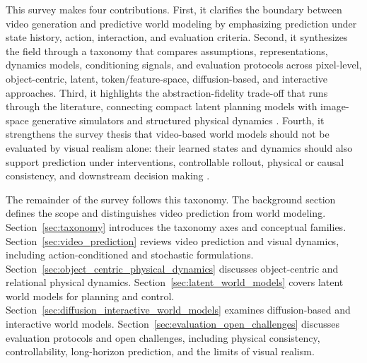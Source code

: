This survey makes four contributions. First, it clarifies the boundary between video generation and predictive world modeling by emphasizing prediction under state history, action, interaction, and evaluation criteria. Second, it synthesizes the field through a taxonomy that compares assumptions, representations, dynamics models, conditioning signals, and evaluation protocols across pixel-level, object-centric, latent, token/feature-space, diffusion-based, and interactive approaches. Third, it highlights the abstraction-fidelity trade-off that runs through the literature, connecting compact latent planning models with image-space generative simulators and structured physical dynamics \cite{battaglia2016_interaction_networks_prov,watters2017_visual_interaction_networks_prov,janner2019_o2p2_prov,hafner2019_planet_prov,hafner2020_dreamer_prov,alonso2024_diamond_prov}. Fourth, it strengthens the survey thesis that video-based world models should not be evaluated by visual realism alone: their learned states and dynamics should also support prediction under interventions, controllable rollout, physical or causal consistency, and downstream decision making \cite{oh2015_action_conditional_video_prediction_prov,janner2019_o2p2_prov,alonso2024_diamond_prov,bruce2024_genie_prov,bansal2025_videophy_prov,li2025worldmodelbench_prov}.

The remainder of the survey follows this taxonomy. The background section defines the scope and distinguishes video prediction from world modeling. Section~\ref{sec:taxonomy} introduces the taxonomy axes and conceptual families. Section~\ref{sec:video_prediction} reviews video prediction and visual dynamics, including action-conditioned and stochastic formulations. Section~\ref{sec:object_centric_physical_dynamics} discusses object-centric and relational physical dynamics. Section~\ref{sec:latent_world_models} covers latent world models for planning and control. Section~\ref{sec:diffusion_interactive_world_models} examines diffusion-based and interactive world models. Section~\ref{sec:evaluation_open_challenges} discusses evaluation protocols and open challenges, including physical consistency, controllability, long-horizon prediction, and the limits of visual realism.
